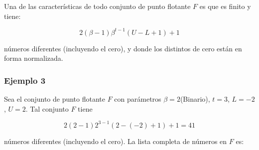 \documentclass[
]{article}
\begin{document}
Una de las características de todo conjunto de punto flotante \(F\) es
que es finito y tiene:

\[
2(\beta - 1)\beta^{t-1}(U - L + 1) + 1
\]

números diferentes (incluyendo el cero), y donde los distintos de cero
están en forma normalizada.

\subsubsection{Ejemplo 3}\label{ejemplo-3}

Sea el conjunto de punto flotante \(F\) con parámetros
\(\beta = 2\)(Binario), \(t = 3\), \(L = -2\), \(U = 2\). Tal conjunto
\(F\) tiene

\[2(2 - 1)2^{3 - 1}(2 - (-2) + 1) + 1 = 41\]

números diferentes (incluyendo el cero). La lista completa de números en
\(F\) es:
\end{document}
